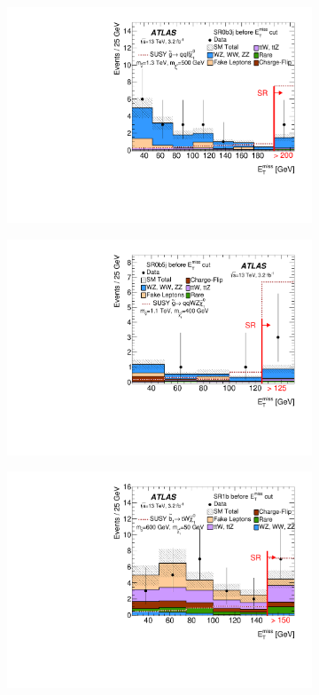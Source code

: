 \begin{figure}[t!]
\centering
\begin{subfigure}[t]{0.49\textwidth}\includegraphics[width=\textwidth]{FIGURES/CONF_SR0b3j.pdf}
\caption{}\label{fig:Results_SR0b3j}\end{subfigure}
\begin{subfigure}[t]{0.49\textwidth}\includegraphics[width=\textwidth]{FIGURES/CONF_SR0b5j.pdf}
\caption{}\label{fig:Results_SR0b5j}\end{subfigure}
\begin{subfigure}[t]{0.49\textwidth}\includegraphics[width=\textwidth]{FIGURES/CONF_SR1b.pdf}

\end{subfigure}
\end{figure}

